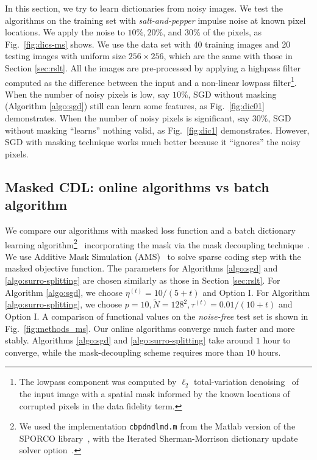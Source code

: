 \documentclass[final]{siamart1116}
\newcommand{\fig}[1]{Fig.~\ref{fig:#1}}
\begin{document}
In this section, we try to learn dictionaries from noisy images. We test the algorithms on the training set with \emph{salt-and-pepper} impulse noise at known pixel locations.  We apply the noise to $10\%, 20\%$, and $30\%$ of the pixels, as \fig{dics-ms} shows.  We use the data set with 40 training images and 20 testing images with uniform size $256\times256$, which are the same with those in Section \ref{sec:rslt}. All the images are pre-processed by applying a highpass filter computed as the difference between the input and a non-linear lowpass filter\footnote{The lowpass component was computed by $\ell_2$ total-variation denoising~\cite{rudin-1992-nonlinear} of the input image with a spatial mask informed by the known locations of corrupted pixels in the data fidelity term.}.  When the number of noisy pixels is low, say $10\%$, SGD without masking (Algorithm \ref{algo:sgd}) still can learn some features, as \fig{dic01} demonstrates. When the number of noisy pixels is significant, say $30\%$, SGD without masking ``learns'' nothing valid, as \fig{dic1} demonstrates. However, SGD with masking technique works much better because it ``ignores'' the noisy pixels.


\subsection{Masked CDL: online algorithms vs batch algorithm}

We compare our algorithms with masked loss function and a batch dictionary learning algorithm\footnote{We used the implementation \texttt{cbpdndlmd.m} from the Matlab version of the SPORCO library~\cite{wohlberg-2016-sporco}, with the Iterated Sherman-Morrison dictionary update solver option~\cite{wohlberg-2016-efficient}.}~\cite{wohlberg-2016-boundary} incorporating the mask via the mask decoupling technique~\cite{heide-2015-fast}.  We use Additive Mask Simulation (AMS)~\cite{wohlberg-2016-boundary} to solve sparse coding step with the masked objective function.  The parameters for Algorithms \ref{algo:sgd} and \ref{algo:surro-splitting} are chosen similarly as those in Section \ref{sec:rslt}. For Algorithm \ref{algo:sgd}, we choose $\eta^{(t)} = 10/(5+t)$ and Option I. For Algorithm \ref{algo:surro-splitting}, we choose $p=10,\tilde{N}=128^2,\tau^{(t)} = 0.01/(10+t)$ and Option I.  A comparison of functional values on the \emph{noise-free} test set is shown in \fig{methods_ms}.  Our online algorithms converge much faster and more stably. Algorithms \ref{algo:sgd} and \ref{algo:surro-splitting} take around $1$ hour to converge, while the mask-decoupling scheme requires more than $10$ hours.
\end{document}
